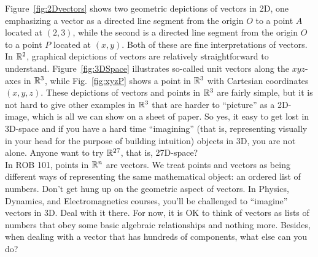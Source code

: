 Figure~\ref{fig:2Dvectors} shows two geometric depictions of vectors in 2D, one emphasizing a vector as a directed line segment from the origin $O$ to a point $A$ located at $(2,3)$, while the second is a directed line segment from the origin $O$ to a point $P$ located at $(x,y)$. Both of these are fine interpretations of vectors. In $\mathbb R^2$, graphical depictions of vectors are relatively straightforward to understand. Figure~\ref{fig:3DSpace} illustrates so-called unit vectors along the $xyz$-axes in $\mathbb R^3$, while Fig.~\ref{fig:xyzP} shows a point in $\mathbb R^3$ with Cartesian coordinates $(x,y,z)$. These depictions of vectors and points in $\mathbb R^3$ are fairly simple, but it is not hard to give other examples in $\mathbb R^3$ that are harder to ``picture'' as a 2D-image, which is all we can show on a sheet of paper. So yes, it easy to get lost in 3D-space and if you have a hard time ``imagining'' (that is, representing visually in your head for the purpose of building intuition) objects in 3D, you are not alone. Anyone want to try $\mathbb R^{27}$, that is, 27D-space?\\

In ROB 101, points in $\mathbb R^n$ are vectors. We treat points and vectors as being different ways of representing the same mathematical object: an ordered list of numbers. Don't get hung up on the geometric aspect of vectors. In Physics, Dynamics, and Electromagnetics courses, you'll be challenged to ``imagine'' vectors in 3D. Deal with it there. For now, it is OK to think of vectors as lists of numbers that obey some basic algebraic relationships and nothing more. Besides, when dealing with a vector that has hundreds of components, what else can you do?

